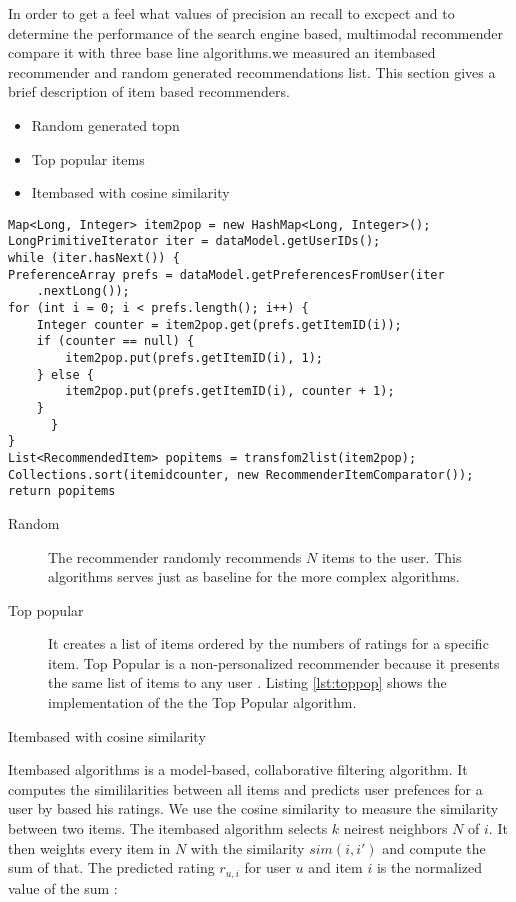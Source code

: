 In order to get a feel what values of precision an recall to excpect and to determine the performance of the search engine based, multimodal recommender compare it with three base line algorithms.we measured an itembased recommender and random generated recommendations list. This section gives a brief description of item based recommenders.

\begin{itemize}
\item Random generated \gls{topn}
\item Top popular items
\item Itembased with cosine similarity
\end{itemize}

\begin{lstlisting}[label=lst:toppop, caption={Implementation of top popular recommender}]
Map<Long, Integer> item2pop = new HashMap<Long, Integer>();
LongPrimitiveIterator iter = dataModel.getUserIDs();
while (iter.hasNext()) {
PreferenceArray prefs = dataModel.getPreferencesFromUser(iter
	.nextLong());
for (int i = 0; i < prefs.length(); i++) {
	Integer counter = item2pop.get(prefs.getItemID(i));
	if (counter == null) {
		item2pop.put(prefs.getItemID(i), 1);
	} else {
		item2pop.put(prefs.getItemID(i), counter + 1);
	}
      }
}
List<RecommendedItem> popitems = transfom2list(item2pop);
Collections.sort(itemidcounter, new RecommenderItemComparator()); 
return popitems
\end{lstlisting}

\begin{description}
\item[Random] The recommender randomly recommends $N$ items to the user. This algorithms serves just as baseline for the more complex algorithms.
\item[Top popular]  It creates a list of items ordered by the numbers of ratings for a specific item. Top Popular is a non-personalized recommender because it presents the same list of items to any user \cite{Cremonesi}. Listing \ref{lst:toppop} shows the implementation of the the Top Popular algorithm. 
\item[Itembased with cosine similarity] 
\end{description} Itembased algorithms is a model-based, collaborative filtering algorithm. It computes the simililarities between all items and predicts user prefences for a user by based his ratings. We use the cosine similarity \cite{ekstrand11} to measure the similarity between two items. The itembased algorithm selects $k$ neirest neighbors $N$ of $i$. It then weights every item in $N$ with the similarity $sim(i,i')$ and compute the sum of that. The predicted rating $r_{u,i}$ for user $u$ and item $i$ is the normalized value of the sum \cite{jannach11}:

